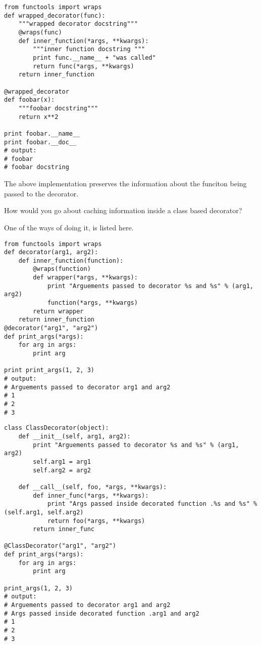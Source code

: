 \begin{verbatim}
from functools import wraps
def wrapped_decorator(func):
    """wrapped decorator docstring"""
    @wraps(func)
    def inner_function(*args, **kwargs):
        """inner function docstring """
        print func.__name__ + "was called"
        return func(*args, **kwargs)
    return inner_function

@wrapped_decorator
def foobar(x):
    """foobar docstring"""
    return x**2

print foobar.__name__
print foobar.__doc__
# output:
# foobar
# foobar docstring
\end{verbatim}
The above implementation preserves the information about the funciton being passed to the decorator.

How would you go about caching information inside a class based decorator?

One of the ways of doing it, is listed here.
\begin{verbatim}
from functools import wraps
def decorator(arg1, arg2):
    def inner_function(function):
        @wraps(function)
        def wrapper(*args, **kwargs):
            print "Arguements passed to decorator %s and %s" % (arg1, arg2)
            function(*args, **kwargs)
        return wrapper
    return inner_function
@decorator("arg1", "arg2")
def print_args(*args):
    for arg in args:
        print arg

print print_args(1, 2, 3)
# output:
# Arguements passed to decorator arg1 and arg2
# 1
# 2
# 3
\end{verbatim}

\begin{verbatim}
class ClassDecorator(object):
    def __init__(self, arg1, arg2):
        print "Arguements passed to decorator %s and %s" % (arg1, arg2)
        self.arg1 = arg1
        self.arg2 = arg2

    def __call__(self, foo, *args, **kwargs):
        def inner_func(*args, **kwargs):
            print "Args passed inside decorated function .%s and %s" % (self.arg1, self.arg2)
            return foo(*args, **kwargs)
        return inner_func

@ClassDecorator("arg1", "arg2")
def print_args(*args):
    for arg in args:
        print arg

print_args(1, 2, 3)
# output:
# Arguements passed to decorator arg1 and arg2
# Args passed inside decorated function .arg1 and arg2
# 1
# 2
# 3
\end{verbatim}

